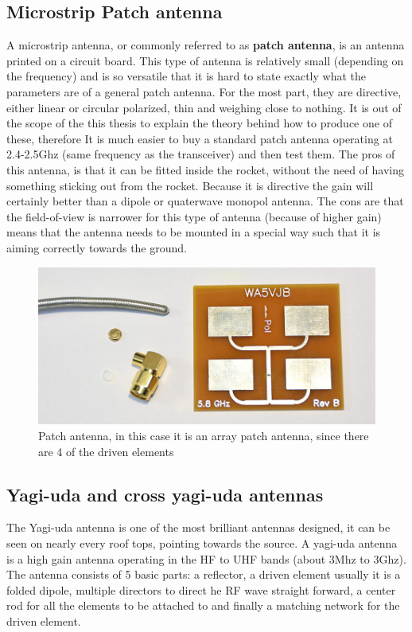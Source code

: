 \subsection{Microstrip Patch antenna}
A microstrip antenna, or commonly referred to as \textbf{patch antenna}, is an antenna printed on a circuit board. This type of antenna is relatively small (depending on the frequency) and is so versatile that it is hard to state exactly what the parameters are of a general patch antenna. For the most part, they are directive, either linear or circular polarized, thin and weighing close to nothing. It is out of the scope of the this thesis to explain the theory behind how to produce one of these, therefore It is much easier to buy a standard patch antenna operating at 2.4-2.5Ghz (same frequency as the transceiver) and then test them. The pros of this antenna, is that it can be fitted inside the rocket, without the need of having something sticking out from the rocket. Because it is directive the gain will certainly better than a dipole or quaterwave monopol antenna. The cons are that the field-of-view is narrower for this type of antenna (because of higher gain) means that the antenna needs to be mounted in a special way such that it is aiming correctly towards the ground.  

\begin{figure}[h]
\centering
\includegraphics[scale=0.5]{figures/PatchAntenna.jpg}
\caption{Patch antenna, in this case it is an array patch antenna, since there are 4 of the driven elements\cite{PatchAntenna}}
\end{figure}

\subsection{Yagi-uda and cross yagi-uda antennas}
The Yagi-uda antenna is one of the most brilliant antennas designed, it can be seen on nearly every roof tops, pointing towards the source. A yagi-uda antenna is a high gain antenna operating in the HF to UHF bands (about 3Mhz to 3Ghz). The antenna consists of 5 basic parts: a reflector, a driven element usually it is a folded dipole, multiple directors to direct he RF wave straight forward, a center rod for all the elements to be attached to and finally a matching network for the driven element.

